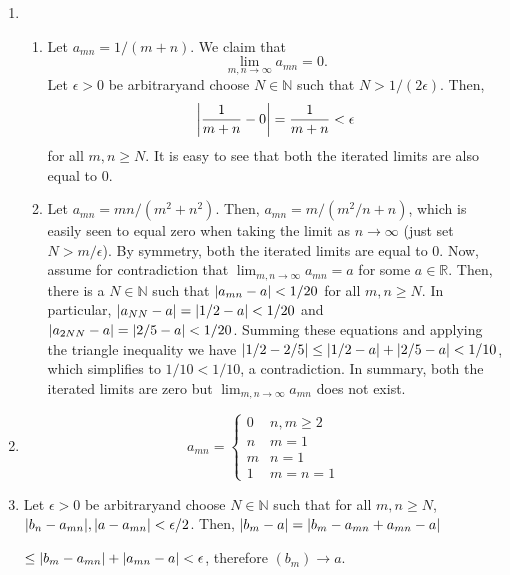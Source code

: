 \documentclass{article}
\DeclarePairedDelimiter\abs{\lvert}{\rvert}
\newcommand{\N}{\mathbb{N}}
\newcommand{\R}{\mathbb{R}}
\newcommand{\lep}[1][L]{#1et $\epsilon > 0$ be arbitrary}
\begin{document}
\begin{enumerate}
\begin{enumerate}
	\item \begin{enumerate}
	\item Let $a_{mn} = 1/(m+n)$. We claim that \begin{equation*}
	      \lim_{m, n \to \infty} a_{mn} = 0.
	\end{equation*} \lep \space and choose $N \in \N$ such that $N > 1/(2\epsilon)$. Then, \begin{equation*}
	\abs*{\frac{1}{m+n} - 0} = \frac{1}{m+n} < \epsilon
	\end{equation*} for all $m,n \geq N$. It is easy to see that both the iterated limits are also equal to $0$.
			        
	\item Let $a_{mn}= mn/(m^2+n^2)$. Then, $a_{mn} = m/(m^2/n+n)$, which is easily seen to equal zero when taking the limit as $n \to \infty$ (just set $N > m/\epsilon$). By symmetry, both the iterated limits are equal to $0$. Now, assume for contradiction that $\lim_{m,n \to \infty} a_{mn}= a$ for some $a \in \R$. Then, there is a $N \in \N$ such that $\abs*{a_{mn} - a}  < 1/20$ for all $m,n \geq N$. In particular, $\abs*{a_{NN}-a} = \abs*{1/2-a} < 1/20$ and $\abs*{a_{2N N} - a} = \abs*{2/5-a} < 1/20$. Summing these equations and applying the triangle inequality we have $\abs*{1/2-2/5}\leq \abs*{1/2-a}+\abs*{2/5-a}<1/10$, which simplifies to $1/10 < 1/10$, a contradiction. In summary, both the iterated limits are zero but $\lim_{m,n \to \infty} a_{mn}$ does not exist.
\end{enumerate}
	    
    \item \begin{equation*}
    a_{m n} = \begin{cases}
    0 & n,m \geq 2 \\
    n & m = 1 \\
    m & n = 1 \\
    1 & m = n = 1
    \end{cases}
    \end{equation*}
    	        
    \item \lep \space and choose $N \in \N$ such that for all $m,n \geq N$, $\abs*{b_n-a_{mn}}, \abs*{a-a_{mn}} < \epsilon/2$. Then, $\abs*{b_m-a} = \abs*{b_m-a_{mn} + a_{mn} - a}$ 
    
    \noindent $\leq \abs*{b_m-a_{mn}} + \abs*{a_{mn}-a} < \epsilon$, therefore $(b_m) \to a$.
    \end{enumerate}
    	

\end{enumerate}
\end{document}
